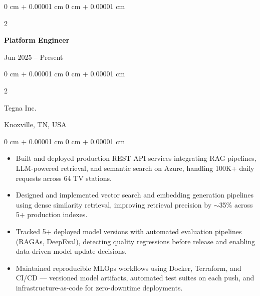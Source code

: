 \documentclass[10pt, letterpaper]{article}
\newenvironment{highlights}{
    \begin{itemize}[
        topsep=0.10 cm,
        parsep=0.10 cm,
        partopsep=0pt,
        itemsep=0pt,
        leftmargin=0 cm + 10pt
    ]
}{
    \end{itemize}
} %
\newenvironment{onecolentry}{
    \begin{adjustwidth}{
        0 cm + 0.00001 cm
    }{
        0 cm + 0.00001 cm
    }
}{
    \end{adjustwidth}
} %
\newenvironment{twocolentry}[2][]{
    \onecolentry
    \def\secondColumn{#2}
    \setcolumnwidth{\fill, 4.5 cm}
    \begin{paracol}{2}
}{
    \switchcolumn \raggedleft \secondColumn
    \end{paracol}
    \endonecolentry
} %
\begin{document}
    \begin{twocolentry}{Jun 2025 -- Present}
        \textbf{Platform Engineer}
    \end{twocolentry}
    \begin{twocolentry}{Knoxville, TN, USA}
       Tegna Inc.
    \end{twocolentry}

    \begin{onecolentry}
        \begin{highlights}
            \item Built and deployed production REST API services integrating RAG pipelines, LLM-powered retrieval, and semantic search on Azure, handling 100K+ daily requests across 64 TV stations.
            \item Designed and implemented vector search and embedding generation pipelines using dense similarity retrieval, improving retrieval precision by $\sim$35\% across 5+ production indexes.
            \item Tracked 5+ deployed model versions with automated evaluation pipelines (RAGAs, DeepEval), detecting quality regressions before release and enabling data-driven model update decisions.
            \item Maintained reproducible MLOps workflows using Docker, Terraform, and CI/CD — versioned model artifacts, automated test suites on each push, and infrastructure-as-code for zero-downtime deployments.
        \end{highlights}
    \end{onecolentry}

\vspace{1mm}
\end{document}
